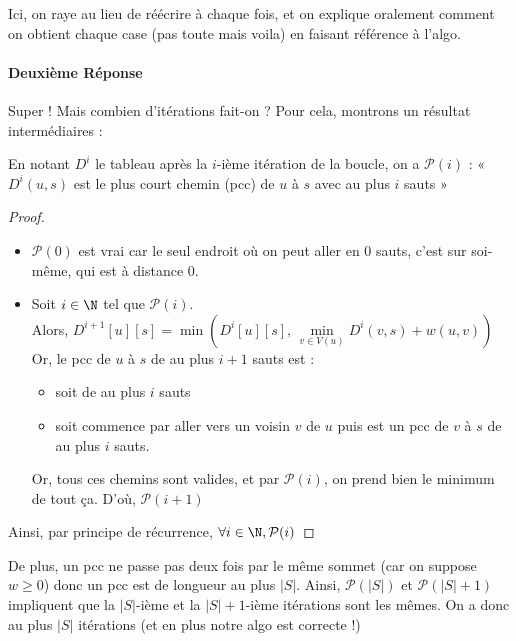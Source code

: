 \begin{com}
	Ici, on raye au lieu de réécrire à chaque fois, et on explique oralement comment on obtient chaque case (pas toute mais voila) en faisant référence à l'algo.
\end{com}

\paragraph{Deuxième Réponse} Super ! Mais combien d'itérations fait-on ? Pour cela, montrons un résultat intermédiaires :

\begin{lemma}
	En notant $D^i$ le tableau après la $i$-ième itération de la boucle, on a $\mathcal P(i)$ : « $D^i(u,s)$ est le plus court chemin (pcc) de $u$ à $s$ avec au plus $i$ sauts »
\end{lemma}

\begin{proof}
	\begin{itemize}[label=$\star$]
		\item $\mathcal P (0)$ est vrai car le seul endroit où on peut aller en 0 sauts, c'est sur soi-même, qui est à distance 0.
		\item Soit $i \in \N$ tel que $\mathcal P(i) $.\\
		Alors, $D^{i+1}[u][s] = \min \left( D^i[u][s], \, \min\limits_{v \in V(u)} D^i(v, s) + w(u,v)\right)$\\
		Or, le pcc de $u$ à $s$ de au plus $i+1$ sauts est :\begin{itemize}
			\item soit de au plus $i$ sauts
			\item soit commence par aller vers un voisin $v$ de $u$ puis est un pcc de $v$ à $s$ de au plus $i$ sauts.
		\end{itemize}
		Or, tous ces chemins sont valides, et par $\mathcal P(i)$, on prend bien le minimum de tout ça. D'où, $\mathcal P(i+1)$
	\end{itemize}
	Ainsi, par principe de récurrence, $\forall i \in \N, \mathcal P (i)$
	
\end{proof}

De plus, un pcc ne passe pas deux fois par le même sommet (car on suppose $w \geq 0$) donc un pcc est de longueur au plus $|S|$. Ainsi, $\mathcal P(|S|)$ et $\mathcal P(|S|+1)$ impliquent que la $|S|$-ième et la $|S|+1$-ième itérations sont les mêmes. On a donc au plus $|S|$ itérations (et en plus notre algo est correcte !)

